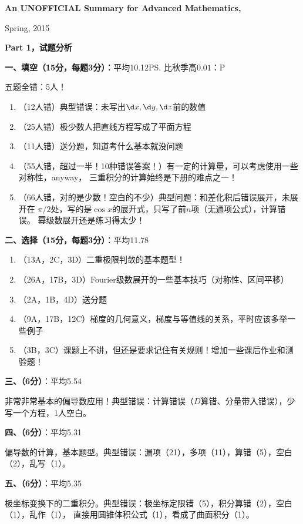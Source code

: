 {\large\bf An UNOFFICIAL Summary for Advanced Mathematics, 

Spring, 2015}
\bigskip

{\large\bf Part 1，试题分析}
\bigskip

{\bf 一、填空（15分，每题3分）}：平均10.12\ps{比秋季高$0.01$：P}

五题全错：5人！

\begin{enumerate}
  \setlength{\itemindent}{1cm}
  \item （12人错）典型错误：未写出$\d x,\d y,\d z$前的数值
  \item （25人错）极少数人把直线方程写成了平面方程
  \item （11人错）送分题，知道考什么基本就没问题
  \item （55人错，超过一半！10种错误答案！）有一定的计算量，可以考虑使用一些对称性，anyway，
  三重积分的计算始终是下册的难点之一！
  \item （66人错，对的是少数！空白的不少）典型问题：和差化积后错误展开，未展开在
  $\pi/2$处，写的是$\cos x$的展开式，只写了前$n$项（无通项公式），计算错误。
  幂级数展开还是练习得太少！
\end{enumerate}

{\bf 二、选择（15分，每题3分）}：平均11.78

\begin{enumerate}
  \setlength{\itemindent}{1cm}
  \item （13A，2C，3D）二重极限判敛的基本题型！
  \item （26A，17B，3D）Fourier级数展开的一些基本技巧（对称性、区间平移）
  \item （2A，1B，4D）送分题
  \item （9A，17B，12C）梯度的几何意义，梯度与等值线的关系，平时应该多举一些例子
  \item （3B，3C）课题上不讲，但还是要求记住有关规则！增加一些课后作业和测验题！
\end{enumerate}

{\bf 三、（6分）}：平均5.54

非常非常基本的偏导数应用！典型错误：计算错误（$D$算错、分量带入错误），少写一个方程，1人空白。

{\bf 四、（6分）}：平均5.31

偏导数的计算，基本题型。典型错误：漏项（21），多项（11），算错（5），空白（2），乱写（1）。

{\bf 五、（6分）}：平均5.35

极坐标变换下的二重积分。典型错误：极坐标定限错（5），积分算错（2），空白（1），乱作（1），
直接用圆锥体积公式（1），看成了曲面积分（1）。

